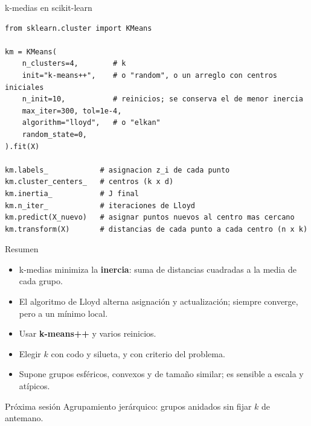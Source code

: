\documentclass[aspectratio=169,11pt]{beamer}
\begin{document}
\begin{frame}[fragile]{k-medias en scikit-learn}
\begin{lstlisting}
from sklearn.cluster import KMeans

km = KMeans(
    n_clusters=4,        # k
    init="k-means++",    # o "random", o un arreglo con centros iniciales
    n_init=10,           # reinicios; se conserva el de menor inercia
    max_iter=300, tol=1e-4,
    algorithm="lloyd",   # o "elkan"
    random_state=0,
).fit(X)

km.labels_            # asignacion z_i de cada punto
km.cluster_centers_   # centros (k x d)
km.inertia_           # J final
km.n_iter_            # iteraciones de Lloyd
km.predict(X_nuevo)   # asignar puntos nuevos al centro mas cercano
km.transform(X)       # distancias de cada punto a cada centro (n x k)
\end{lstlisting}
\end{frame}



\begin{frame}{Resumen}
  \begin{itemize}
    \item k-medias minimiza la \textbf{inercia}: suma de distancias cuadradas a la media de cada grupo.
    \item El algoritmo de Lloyd alterna asignación y actualización; siempre converge, pero a un \alert{mínimo local}.
    \item Usar \textbf{k-means++} y varios reinicios.
    \item Elegir $k$ con codo y silueta, y con criterio del problema.
    \item Supone grupos esféricos, convexos y de tamaño similar; es sensible a escala y atípicos.
  \end{itemize}
  \vspace{6pt}
  \begin{block}{Próxima sesión}
    Agrupamiento jerárquico: grupos anidados sin fijar $k$ de antemano.
  \end{block}
\end{frame}
\end{document}
